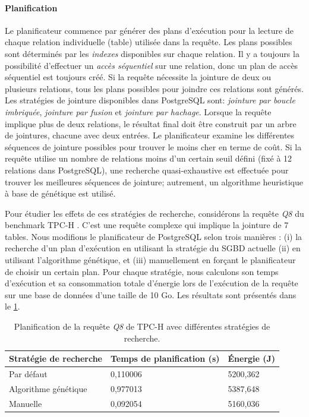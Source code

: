 \paragraph{Planification}
Le planificateur commence par générer des plans d'exécution pour la lecture de chaque relation individuelle (table) utilisée dans la requête. Les plans possibles sont déterminés par les \textit{indexes} disponibles sur chaque relation. Il y a toujours la possibilité d'effectuer un \textit{accès séquentiel} sur une relation, donc un plan de accès séquentiel est toujours créé. Si la requête nécessite la jointure de deux ou plusieurs relations, tous les plans possibles pour joindre ces relations sont générés. Les stratégies de jointure disponibles dans PostgreSQL sont: \textit {jointure par boucle imbriquée}, \textit{jointure par fusion} et \textit{jointure par hachage}. Lorsque la requête implique plus de deux relations, le résultat final doit être construit par un arbre de jointures, chacune avec deux entrées. Le planificateur examine les différentes séquences de jointure possibles pour trouver le moins cher en terme de coût. Si la requête utilise un nombre de relations moins d'un certain seuil défini (fixé à 12 relations dans PostgreSQL), une recherche quasi-exhaustive est effectuée pour trouver les meilleures séquences de jointure; autrement, un algorithme heuristique à base de génétique est utilisé.

Pour étudier les effets de ces stratégies de recherche, considérons la requête \textit{Q8} du benchmark TPC-H \cite{TPCH}. C'est une requête complexe qui implique la jointure de 7 tables. Nous modifions le planificateur de PostgreSQL selon trois manières : (i) la recherche d'un plan d'exécution en utilisant la stratégie du SGBD actuelle (ii) en utilisant l'algorithme génétique, et (iii) manuellement en forçant le planificateur de choisir un certain plan. Pour chaque stratégie, nous calculons son temps d'exécution et sa consommation totale d'énergie lors de l'exécution de la requête sur une base de données d'une taille de 10 Go. Les résultats sont présentés dans le \ref{tab:plan-algo}.

\begin{table}
\centering
\caption {Planification de la requête \textit{Q8} de TPC-H avec différentes stratégies de recherche.} \label{tab:plan-algo}
\begin{tabular}{lll}
    \toprule
    \textbf{Stratégie de recherche} & \textbf{Temps de planification (s)} & \textbf{Énergie (J)} \\
    \midrule
    Par défaut & 0,110006 & 5200,362\\ 
	Algorithme génétique & 0,977013 & 5387,648 \\ 
    Manuelle & 0,092054 & 5160,036 \\
    \bottomrule
\end{tabular}
\end{table}

